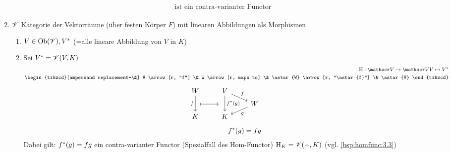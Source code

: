 \begin{beispiel}
\begin{enumerate}
\begin{align*}
\begin{matrix}
			\end{matrix} \text{ ist ein contra-varianter Functor}
		\end{align*}
		\item $\mathscr V$ Kategorie der Vektorräume (über festen Körper $F$) mit linearen Abbildungen als Morphismen
		\begin{enumerate}[label=]
			\item $V \in \operatorname{Ob}(\mathscr V), V^{\ast}$  (=alle lineare Abbildung von $V$ in $K$)
			\item Sei $V^{\ast} = \mathscr V(V,K)$
			\begin{align*}
				\HFunc: \V \to \V \mit V \mapsto \astar{V}\\
				\begin{tikzcd}[ampersand replacement=\&]
				V \arrow[r, "f"] \& W \arrow[r, maps to] \& \astar{W} \arrow[r, "\astar{f}"] \& \astar{V}
				\end{tikzcd}
			\end{align*}
			\begin{align*}
				\begin{tikzcd}[row sep=tiny,ampersand replacement=\&]
					W \arrow[dd, "f"']             \& V \arrow[dd, "\astar{f}(g)"] \arrow[dr, "f"] \&                  \\
					\arrow[r,maps to, shorten=1mm] \& \                                 \& W \arrow[dl, "g"]\\
					K                              \& K                                 \&                  \\
				\end{tikzcd}\\
				\astar{f}(g) = fg
			\end{align*}
			Dabei gilt: $f^{\ast}(g) = fg$ ein contra-varianter Functor (Spezialfall des Hom-Functor) $\operatorname{H}_{K} = \mathscr V(-,K)$ (vgl. \ref{bsp:homfunc:3.3})
		\end{enumerate}
	\end{enumerate}
\end{beispiel}
